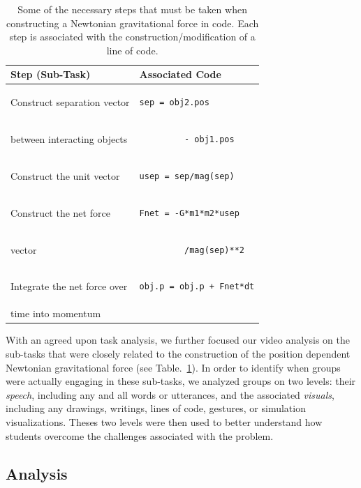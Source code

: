 \documentclass{msuphddissertation}
\begin{document}
\begin{doublespace}
\begin{table}[hb]
\caption{Some of the necessary steps that must be taken when constructing a Newtonian gravitational force in code.  Each step is associated with the construction/modification of a line of code.\label{tab1}}
\begin{tabular}{ll}
\textbf{Step (Sub-Task)} & \textbf{Associated Code} \\\hline
Construct separation vector & \begin{lstlisting}
sep = obj2.pos
\end{lstlisting}\\
between interacting objects & \begin{lstlisting}
         - obj1.pos
\end{lstlisting}\\\hline
Construct the unit vector & \begin{lstlisting}
usep = sep/mag(sep)
\end{lstlisting}\\\hline
Construct the net force & \begin{lstlisting}
Fnet = -G*m1*m2*usep
\end{lstlisting}\\
vector & \begin{lstlisting}
         /mag(sep)**2
\end{lstlisting}\\\hline
Integrate the net force over & \begin{lstlisting}
obj.p = obj.p + Fnet*dt
\end{lstlisting}\\
time into momentum & \\
\end{tabular}
\end{table}

With an agreed upon task analysis, we further focused our video analysis on the sub-tasks that were closely related to the construction of the position dependent Newtonian gravitational force (see Table.~\ref{tab1}).  In order to identify when groups were actually engaging in these sub-tasks, we analyzed groups on two levels: their \textit{speech}, including any and all words or utterances, and the associated \textit{visuals}, including any drawings, writings, lines of code, gestures, or simulation visualizations.  Theses two levels were then used to better understand how students overcome the challenges associated with the problem.

\subsection{Analysis}


\end{doublespace}
\end{document}
